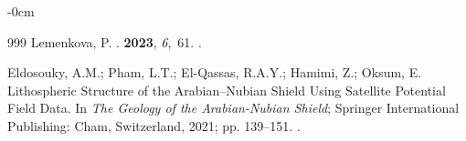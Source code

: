 \documentclass[jimaging,article,accept,pdftex,moreauthors]{Definitions/mdpi}
\begin{document}
\begin{adjustwidth}{-\extralength}{0cm}
\begin{thebibliography}{999}
Lemenkova, P.
.
 {\bf 2023}, {\em 6},~61.
.

Eldosouky, A.M.; Pham, L.T.; El-Qassas, R.A.Y.; Hamimi, Z.; Oksum, E.
  Lithospheric Structure of the Arabian--Nubian Shield Using Satellite
  Potential Field Data.
\newblock In {\em The Geology of the Arabian-Nubian Shield}; Springer
  International Publishing: Cham, Switzerland, 2021; pp. 139--151.
.

\end{thebibliography}
\PublishersNote{}

\end{adjustwidth}
\end{document}
